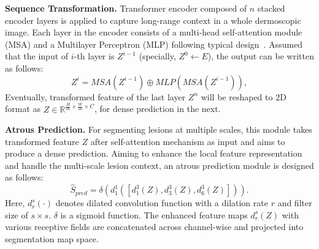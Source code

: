 \documentclass[runningheads]{paper478-llncs}
\begin{document}
\textbf{Sequence Transformation.}
Transformer encoder composed of $n$ stacked encoder layers is applied to capture long-range context in a whole dermoscopic image. 
Each layer in the encoder consists of a multi-head self-attention module (MSA) and a Multilayer Perceptron (MLP) following typical design~\cite{vaswani2017attention}.
Assumed that the input of $i$-th layer is $Z^{i-1}$ (specially, $Z^0 \leftarrow E$), the output can be written as follows:
\begin{equation}
    Z^{i} = MSA(Z^{i-1}) \oplus MLP(MSA(Z^{i-1})),
\end{equation}
Eventually, transformed feature of the last layer $Z^{n}$ will be reshaped to 2D format as $Z  \in \mathbb{R}^{\tfrac{H}{16} \times \tfrac{W}{16}\times C}$, for dense prediction in the next.

\textbf{Atrous Prediction.} For segmenting lesions at multiple scales, this module takes transformed feature $Z$ after self-attention mechanism as input and aims to produce a dense prediction. Aiming to enhance the local feature representation and handle the multi-scale lesion context, an atrous prediction module is designed as follows:
\begin{equation}
    \hat{S}_{pred} = \delta(d_{1}^{1}([d_{1}^{3}(Z),d_{3}^{3}(Z),d_{6}^{3}(Z)])).
\end{equation}
Here, $d_r^s(\cdot)$ denotes dilated convolution function with a dilation rate $r$ and filter size of $s \times s$. $\delta$ is a sigmoid function. The enhanced feature maps $d_r^s(Z)$ with various receptive fields are concatenated across channel-wise and projected into segmentation map space. 
\end{document}
